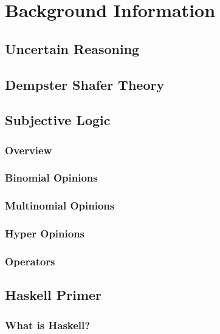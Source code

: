 \documentclass[thesis.tex]{subfiles}
\begin{document}
\chapter{Background Information}



\section{Uncertain Reasoning}


\section{Dempster Shafer Theory}




\section{Subjective Logic}

\subsection{Overview}

\subsection{Binomial Opinions}

\subsection{Multinomial Opinions}

\subsection{Hyper Opinions}

\subsection{Operators}






\section{Haskell Primer}

\subsection{What is Haskell?}
\end{document}
